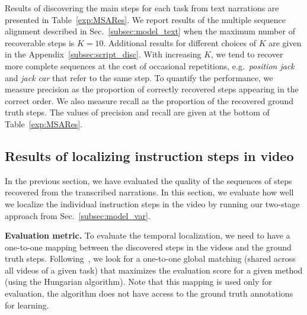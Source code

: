 \documentclass[10pt,twocolumn,letterpaper]{article}
\begin{document}
Results of discovering the main steps for each task from text narrations are presented in Table~\ref{exp:MSARes}.
We report results of the multiple sequence alignment described in Sec.~\ref{subsec:model_text} when the maximum number of recoverable steps is $K=10$. Additional results for different choices of $K$ are given in the Appendix~\ref{subsec:script_disc}. %
%
%
With increasing $K$, we tend to recover more complete sequences at the cost of occasional repetitions, e.g.~{\em position jack} and {\em jack car} that refer to the same step. 
%
To quantify the performance, we measure precision as the proportion of correctly recovered steps appearing in the correct order. 
We also measure recall as the proportion of the recovered ground truth steps. 
The values of precision and recall are given at the bottom of Table~\ref{exp:MSARes}.
%
%
%


%
\subsection{Results of localizing instruction steps in video}
\label{sec:localization}
%

In the previous section, we have evaluated the quality of the sequences of steps recovered from the transcribed narrations. 
In this section, we evaluate how well we localize the individual instruction steps in the video by running our two-stage approach from Sec.~\ref{subsec:model_var}.


\textbf{Evaluation metric.}
To evaluate the temporal localization, we need to have a one-to-one mapping between the discovered steps in the videos and the ground truth steps.  Following~\cite{Liao05Clustering}, we look for a one-to-one global matching (shared across all videos of a given task) that maximizes the evaluation score for a given method (using the Hungarian algorithm).
Note that this mapping is used only for evaluation, the algorithm does not have access to the ground truth annotations for learning.
\end{document}
